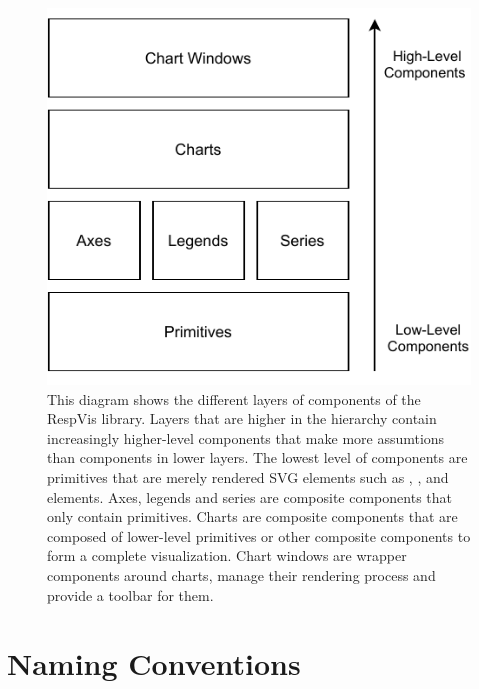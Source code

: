 \begin{figure}[tp]
\centering
\includegraphics[keepaspectratio,width=\linewidth,height=\fullh / 3]{diagrams/respvis-layers.pdf}
\caption[Component Layers of RespVis]{
  This diagram shows the different layers of components of the RespVis library.
  Layers that are higher in the hierarchy contain increasingly higher-level components that make more assumtions than components in lower layers.
  The lowest level of components are primitives that are merely rendered SVG elements such as , , and  elements.
  Axes, legends and series are composite components that only contain primitives.
  Charts are composite components that are composed of lower-level primitives or other composite components to form a complete visualization.
  Chart windows are wrapper components around charts, manage their rendering process and provide a toolbar for them.  
}
\label{fig:Layers}
\end{figure}


\section{Naming Conventions}
\label{sec:NamingConventions}

